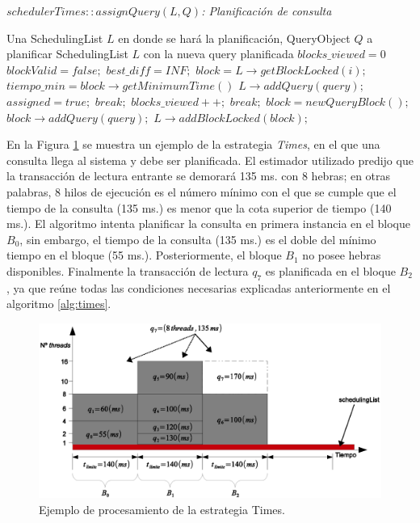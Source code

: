 \begin{algorithm}[!th]
\caption{\em $schedulerTimes::assignQuery(L, Q)$: Planificación de consulta}
\label{alg:times}
\begin{algorithmic}[1]
\REQUIRE Una SchedulingList $L$ en donde se hará la planificación, QueryObject $Q$ a planificar
\ENSURE SchedulingList $L$ con la nueva query planificada	
	\STATE $blocks\_viewed = 0$
	\STATE $blockValid = false;$	
	\STATE $best\_diff = INF;$	
		\STATE $block = L \rightarrow getBlockLocked(i);$		
			\STATE $tiempo\_min = block \rightarrow getMinimumTime()$			
				\STATE $L \rightarrow addQuery(query);$
				\STATE $assigned = true;$
				\STATE $break;$
			\ENDIF						
			\STATE $blocks\_viewed++;$			
				\STATE $break;$
			\ENDIF			
		\ENDIF		
	\ENDFOR	
		\STATE $block = new QueryBlock();$
		\STATE $block \rightarrow addQuery(query);$
		\STATE $L \rightarrow addBlockLocked(block);$		
	\ENDIF	
\end{algorithmic}
\end{algorithm}

En la Figura \ref{fig:proceso_Times} se muestra un ejemplo de la estrategia \textit{Times}, en el que una consulta llega al sistema y debe ser planificada. El estimador utilizado predijo que la transacción de lectura entrante se demorará 135 ms. con 8 hebras; en otras palabras, 8 hilos de ejecución es el número mínimo con el que se cumple que el tiempo de la consulta (135 ms.) es menor que la cota superior de tiempo (140 ms.). El algoritmo intenta planificar la consulta en primera instancia en el bloque $B_0$, sin embargo, el tiempo de la consulta (135 ms.) es el doble del mínimo tiempo en el bloque (55 ms.). Posteriormente, el bloque $B_1$ no posee hebras disponibles. Finalmente la transacción de lectura $q_7$ es planificada en el bloque $B_2$, ya que reúne todas las condiciones necesarias explicadas anteriormente en el algoritmo \ref{alg:times}. 

\begin{figure}[!th]
\centering
\includegraphics[scale=.75]{images/proceso_Times.eps}
\caption{Ejemplo de procesamiento de la estrategia Times.}
\label{fig:proceso_Times}
\end{figure} 

